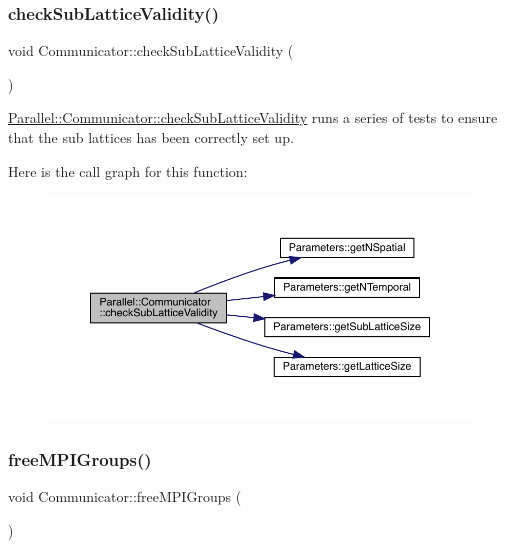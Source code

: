 \subsubsection{\texorpdfstring{checkSubLatticeValidity()}{checkSubLatticeValidity()}}
{\footnotesize\ttfamily void Communicator\+::check\+Sub\+Lattice\+Validity (\begin{DoxyParamCaption}{ }\end{DoxyParamCaption})\hspace{0.3cm}{\ttfamily [static]}}



\mbox{\hyperlink{class_parallel_1_1_communicator_a5da7239eefebcebbeeabee499b2d724d}{Parallel\+::\+Communicator\+::check\+Sub\+Lattice\+Validity}} runs a series of tests to ensure that the sub lattices has been correctly set up. 

Here is the call graph for this function\+:\nopagebreak
\begin{figure}[H]
\begin{center}
\leavevmode
\includegraphics[width=350pt]{class_parallel_1_1_communicator_a5da7239eefebcebbeeabee499b2d724d_cgraph}
\end{center}
\end{figure}
\mbox{\label{class_parallel_1_1_communicator_aca0ac979aee1a649dbe5d4582b06a707}} 
\subsubsection{\texorpdfstring{freeMPIGroups()}{freeMPIGroups()}}
{\footnotesize\ttfamily void Communicator\+::free\+M\+P\+I\+Groups (\begin{DoxyParamCaption}{ }\end{DoxyParamCaption})\hspace{0.3cm}{\ttfamily [static]}}




